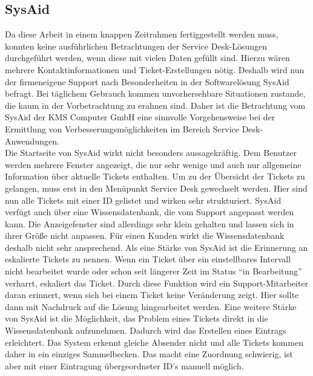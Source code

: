 \subsection{SysAid}
\noindent
Da diese Arbeit in einem knappen Zeitrahmen fertiggestellt werden muss, konnten keine ausführlichen Betrachtungen der Service Desk-Lösungen durchgeführt werden, wenn diese mit vielen Daten gefüllt sind. Hierzu wären mehrere Kontaktinformationen und Ticket-Erstellungen nötig. Deshalb wird nun der firmeneigene Support nach Besonderheiten in der Softwarelösung SysAid befragt. Bei täglichem Gebrauch kommen unvorhersehbare Situationen zustande, die kaum in der Vorbetrachtung zu erahnen sind. Daher ist die Betrachtung vom SysAid der KMS Computer GmbH eine sinnvolle Vorgehensweise bei der Ermittlung von Verbesserungsmöglichkeiten im Bereich Service Desk-Anwendungen.\\
\noindent
Die Startseite von SysAid wirkt nicht besonders aussagekräftig. Dem Benutzer werden mehrere Fenster angezeigt, die nur sehr wenige und auch nur allgemeine Information über aktuelle Tickets enthalten. Um zu der Übersicht der Tickets zu gelangen, muss erst in den Menüpunkt Service Desk gewechselt werden. Hier sind nun alle Tickets mit einer ID gelistet und wirken sehr strukturiert. \newline
SysAid verfügt auch über eine Wissensdatenbank, die vom Support angepasst werden kann. Die Anzeigefenster sind allerdings sehr klein gehalten und lassen sich in ihrer Größe nicht anpassen. Für einen Kunden wirkt die Wissensdatenbank deshalb nicht sehr ansprechend.\newline
Als eine Stärke von SysAid ist die Erinnerung an eskalierte Tickets zu nennen. Wenn ein Ticket über ein einstellbares Intervall  nicht bearbeitet wurde oder schon seit längerer Zeit im Status \enquote{in Bearbeitung} verharrt, eskaliert das Ticket.\newline
Durch diese Funktion wird ein Support-Mitarbeiter daran erinnert, wenn sich bei einem Ticket keine Veränderung zeigt. Hier sollte dann mit Nachdruck auf die Lösung hingearbeitet werden. Eine weitere Stärke von SysAid ist die Möglichkeit, das Problem eines Tickets direkt in die Wissensdatenbank aufzunehmen. Dadurch wird das Erstellen eines Eintrags erleichtert. \newline
Das System erkennt  gleiche Absender nicht und alle Tickets kommen daher in ein einziges Sammelbecken. Das macht eine Zuordnung schwierig, ist aber mit einer Eintragung übergeordneter ID's manuell möglich.\newline
